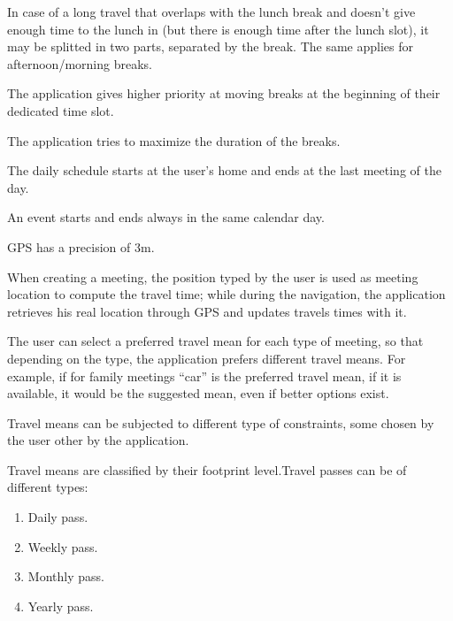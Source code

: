 \begin{list}
\item
In case of a long travel that overlaps with the lunch break and doesn’t give enough time to the lunch in (but there is enough time after the lunch slot), it may be splitted in two parts, separated by the break. The same applies for afternoon/morning breaks.
\item
The application gives higher priority at moving breaks at the beginning of their dedicated time slot.
\item
The application tries to maximize the duration of the breaks.
\item
The daily schedule starts at the user's home and ends at the last meeting of the day.
\item
An event starts and ends always in the same calendar day.
\item
GPS has a precision of 3m.
\item
When creating a meeting, the position typed by the user is used as meeting location to compute the travel time; while during the navigation, the application retrieves his real location through GPS and updates travels times with it.
\item
The user can select a preferred travel mean for each type of meeting, so that depending on the type, the application prefers different travel means. For example, if for family meetings “car” is the preferred travel mean, if it is available, it would be the suggested mean, even if better options exist.
\item
Travel means can be subjected to different type of constraints, some chosen by the user other by the application.
\item
Travel means are classified by their footprint level.Travel passes can be of different types:
\begin{enumerate}
\item
Daily pass.
\item
Weekly pass.
\item
Monthly pass.
\item
Yearly pass.
\end{enumerate}


\end{list}
